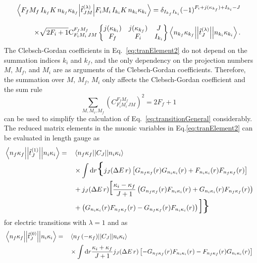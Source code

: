 \begin{alignat}{2}
\left<F_fM_f\,I_{k_f}K\,n_{k_f}\kappa_{k_f} \middle|\hat{t}^{(\lambda)}_{JM}\middle|F_iM_i\,I_{k_i}K\,n_{k_i}\kappa_{k_i}\right>=\delta_{I_{k_f}I_{k_i}}(-1)^{F_i+j(\kappa_{k_f})+I_{k_i}-J}
\notag\\[7.5pt]
\times\sqrt{2F_i+1}\text{C}^{F_fM_f}_{F_iM_i\,JM}
\begin{Bmatrix}
j(\kappa_{k_i})&j(\kappa_{k_f})&J\\
F_f&F_i&I_{k_i}
\end{Bmatrix}
\left< n_{k_f}\kappa_{k_f}\middle|\middle|\hat{t}^{(\lambda)}_{J}\middle|\middle|n_{k_i}\kappa_{k_i}\right>.
\label{eq:tranElement2}
\end{alignat}
The Clebsch-Gordan coefficients in Eq.~\eqref{eq:tranElement2} do not depend on the summation indices $k_i$ and $k_f$, and the only dependency on the projection numbers $M$, $M_f$, and $M_i$ are as arguments of the Clebsch-Gordan coefficients. Therefore, the summation over $M$, $M_f$, $M_i$ only affects the Clebsch-Gordan coefficient and the sum rule~\cite{varshalovich1988}
\begin{equation}
\sum_{M,M_i,M_f}\left(C^{F_fM_f}_{F_iM_i\,JM}\right)^2 = 2F_f+1
\end{equation}
can be used to simplify the calculation of Eq.~\eqref{eq:transitionGeneral} considerably. The reduced matrix elements in the muonic variables in Eq.\eqref{eq:tranElement2} can be evaluated in length gauge as~\cite{johnson2007}
\begin{alignat}{2}
\label{eq:relElTrans}
&\left< n_{f}\kappa_{f}\middle|\middle|\hat{t}^{(1)}_{J}\middle|\middle|n_{i}\kappa_{i}\right>=&&
\left<n_f\kappa_f\middle|\middle|C_J\middle|\middle|n_i\kappa_i\right>\\
&&&\times\int\text{d}r \text{\huge\{}j_J(\Delta E\,r)\left[G_{n_f\kappa_f}(r)G_{n_i\kappa_i}(r)+F_{n_i\kappa_i}(r)F_{n_f\kappa_f}(r)\right]\\
&&& +j_J(\Delta E\,r)\text{\huge[}\frac{\kappa_i-\kappa_f}{J+1}
\left(G_{n_f\kappa_f}(r)F_{n_i\kappa_i}(r)+G_{n_i\kappa_i}(r)F_{n_f\kappa_f}(r)\right)\\
&&& +\left(G_{n_i\kappa_i}(r)F_{n_f\kappa_f}(r)-G_{n_f\kappa_f}(r)F_{n_i\kappa_i}(r)\right)
 \text{\huge]}\text{\huge\}}
\end{alignat}
for electric transitions with $\lambda= 1 $ and as
\begin{alignat}{2}
&\left< n_{f}\kappa_{f}\middle|\middle|\hat{t}^{(0)}_{J}\middle|\middle|n_{i}\kappa_{i}\right>=&&
\left<n_f\,({-}{\kappa_f})\middle|\middle|C_J\middle|\middle|n_i\kappa_i\right>\notag\\
&&&\times\int\text{d}r\frac{\kappa_i+\kappa_f}{J+1}j_J(\Delta E\,r)\left[-G_{n_f\kappa_f}(r)F_{n_i\kappa_i}(r)-F_{n_f\kappa_f}(r)G_{n_i\kappa_i}(r)\right]
\end{alignat}
